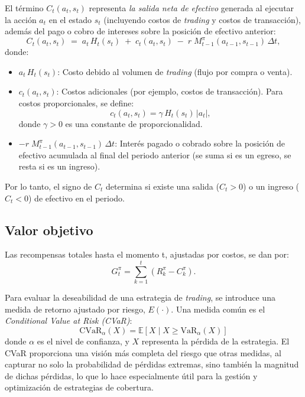 \documentclass[11pt,a4paper,spanish]{article}
\numberwithin{equation}{section} %
\begin{document}
El término \( C_t(a_{t}, s_{t}) \) representa \emph{la salida neta de efectivo} generada al ejecutar la acción \( a_t \) en el estado \( s_t \) (incluyendo costos de \textit{trading} y costos de transacción), además del pago o cobro de intereses sobre la posición de efectivo anterior:
\begin{equation}
C_t(a_t, s_t) \;=\; a_t\,H_t(s_t) \;+\; c_t(a_t, s_t) \;-\; r\;M_{t-1}^\pi(a_{t-1}, s_{t-1})\,\Delta t,
\end{equation}
donde:
\begin{itemize}
    \item \( a_t \, H_t(s_t) \): Costo debido al volumen de \textit{trading} (flujo por compra o venta).  
    \item \( c_t(a_t, s_t) \): Costos adicionales (por ejemplo, costos de transacción). Para costos proporcionales, se define:
    \begin{equation}
    c_t(a_t, s_t) = \gamma \, H_t(s_t) \, |a_t|,
    \end{equation}
    donde \( \gamma > 0 \) es una constante de proporcionalidad.
    \item \(-r\;M_{t-1}^\pi(a_{t-1}, s_{t-1})\,\Delta t\): Interés pagado o cobrado sobre la posición de efectivo acumulada al final del periodo anterior (se suma si es un egreso, se resta si es un ingreso).
\end{itemize}

Por lo tanto, el signo de \( C_t\) determina si existe una salida (\( C_t> 0\)) o un ingreso (\( C_t <  0\)) de efectivo en el periodo.

\subsection{Valor objetivo}

Las recompensas totales hasta el momento t, ajustadas por costos, se dan por:
\begin{equation}
G_t^\pi = \sum_{k=1}^t \left( R_k^\pi - C_k^\pi \right).
\end{equation}

Para evaluar la deseabilidad de una estrategia de \textit{trading}, se introduce una medida de retorno ajustado por riesgo, \( E(\cdot) \). Una medida común es el \textit{Conditional Value at Risk (CVaR)}:
\begin{equation}
\text{CVaR}_\alpha(X) = \mathbb{E}[X \mid X \geq \text{VaR}_\alpha(X)]
\end{equation}
donde \( \alpha \) es el nivel de confianza, y \(X\) representa la pérdida de la estrategia. El CVaR proporciona una visión más completa del riesgo que otras medidas, al capturar no solo la probabilidad de pérdidas extremas, sino también la magnitud de dichas pérdidas, lo que lo hace especialmente útil para la gestión y optimización de estrategias de cobertura.
\end{document}

